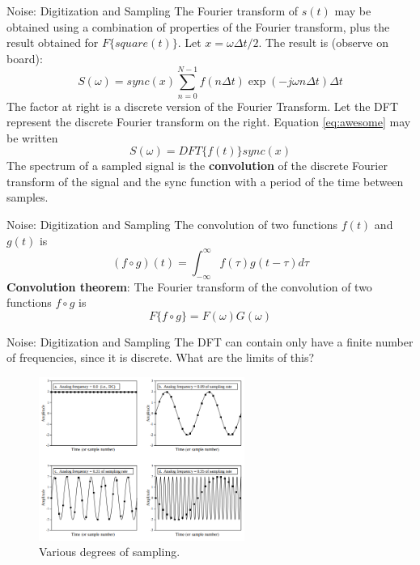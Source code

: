 \documentclass{beamer}
\begin{document}
\begin{frame}{Noise: Digitization and Sampling}
\small
The Fourier transform of $s(t)$ may be obtained using a combination of properties of the Fourier transform, plus the result obtained for $F\lbrace square(t) \rbrace$.  Let $x = \omega \Delta t/2$.  The result is (observe on board):
\begin{equation}
S(\omega) = sync(x) \sum_{n=0}^{N-1} f(n\Delta t) \exp(-j\omega n\Delta t) \Delta t \label{eq:awesome}
\end{equation}
The factor at right is a discrete version of the Fourier Transform.  Let the DFT represent the discrete Fourier transform on the right.  Equation \ref{eq:awesome} may be written
\begin{equation}
S(\omega) = DFT\lbrace f(t) \rbrace sync(x) 
\end{equation}
\alert{The spectrum of a sampled signal is the \textbf{convolution} of the discrete Fourier transform of the signal and the sync function with a period of the time between samples.}
\end{frame}

\begin{frame}{Noise: Digitization and Sampling}
The convolution of two functions $f(t)$ and $g(t)$ is 
\begin{equation}
(f \circ g) (t) = \int_{-\infty}^{\infty} f(\tau) g(t-\tau) d\tau
\end{equation}
\textbf{Convolution theorem}:  The Fourier transform of the convolution of two functions $f \circ g$ is
\begin{equation}
F\lbrace f \circ g\rbrace = F(\omega) G(\omega)
\end{equation}
\end{frame}

\begin{frame}{Noise: Digitization and Sampling}
The DFT can contain only have a finite number of frequencies, since it is discrete.  What are the limits of this?
\begin{figure}
\centering
\includegraphics[width=0.6\textwidth]{figures/sampling.png}
\caption{\label{fig:sampling} Various degrees of sampling.}
\end{figure}
\end{frame}
\end{document}
